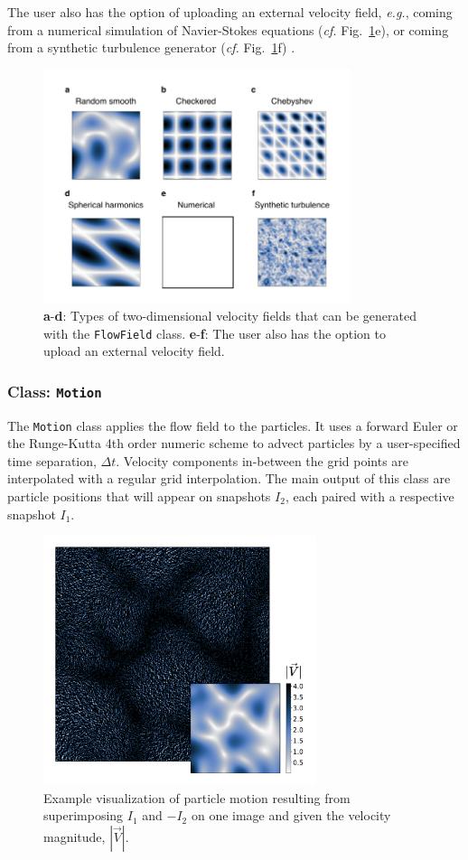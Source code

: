 \documentclass[a4paper,fleqn]{cas-dc}
\begin{document}
The user also has the option of uploading an external velocity field, \textit{e.g.}, coming from a numerical simulation of Navier-Stokes equations (\textit{cf.} Fig.~\ref{fig:velocity-fields}e), or coming from a synthetic turbulence generator (\textit{cf.} Fig.~\ref{fig:velocity-fields}f) \citep{saad2017scalable, richards2018fast}.

\begin{figure}[t]
\centering
\includegraphics[width=9cm]{velocity-fields.pdf}
\caption{\textbf{a}-\textbf{d}: Types of two-dimensional velocity fields that can be generated with the \texttt{FlowField} class. \textbf{e}-\textbf{f}: The user also has the option to upload an external velocity field.}
\label{fig:velocity-fields}
\end{figure}

\subsubsection{Class: \texttt{Motion}} \label{sec:class-Motion}

The \texttt{Motion} class applies the flow field to the particles. It uses a forward Euler or the Runge-Kutta 4th order numeric scheme to advect particles by a user-specified time separation, $\Delta t$. Velocity components in-between the grid points are interpolated with a regular grid interpolation. The main output of this class are particle positions that will appear on snapshots $I_2$, each paired with a respective snapshot $I_1$.

\begin{figure}[t]
\centering
\includegraphics[width=8cm]{motion-image.pdf}
\caption{Example visualization of particle motion resulting from superimposing $I_1$ and $-I_2$ on one image and given the velocity magnitude, $|\vec{V}|$.}
\label{fig:particle-motion}
\end{figure}
\end{document}
